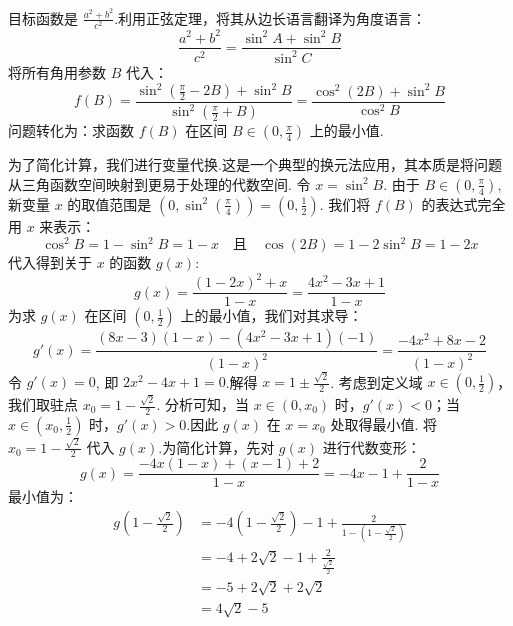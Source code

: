 \begin{solution}
	目标函数是 $\frac{a^2+b^2}{c^2}$.利用正弦定理，将其从边长语言翻译为角度语言：
	\[
	\frac{a^2+b^2}{c^2} = \frac{\sin^2 A + \sin^2 B}{\sin^2 C}
	\]
	将所有角用参数 $B$ 代入：
	\[
	f(B) = \frac{\sin^2(\frac{\pi}{2}-2B) + \sin^2 B}{\sin^2(\frac{\pi}{2}+B)} = \frac{\cos^2(2B) + \sin^2 B}{\cos^2 B}
	\]
	问题转化为：求函数 $f(B)$ 在区间 $B \in (0, \frac{\pi}{4})$ 上的最小值.
	
	为了简化计算，我们进行变量代换.这是一个典型的换元法应用，其本质是将问题从三角函数空间映射到更易于处理的代数空间.
	令 $x = \sin^2 B$.
	由于 $B \in (0, \frac{\pi}{4})$, 新变量 $x$ 的取值范围是 $(0, \sin^2(\frac{\pi}{4})) = (0, \frac{1}{2})$.
	我们将 $f(B)$ 的表达式完全用 $x$ 来表示：
	\[
	\cos^2 B = 1-\sin^2 B = 1-x \quad \text{且} \quad \cos(2B) = 1-2\sin^2 B = 1-2x
	\]
	代入得到关于 $x$ 的函数 $g(x)$:
	\[
	g(x) = \frac{(1-2x)^2+x}{1-x} = \frac{4x^2-3x+1}{1-x}
	\]
	为求 $g(x)$ 在区间 $(0, \frac{1}{2})$ 上的最小值，我们对其求导：
	\[
	g'(x) = \frac{(8x-3)(1-x) - (4x^2-3x+1)(-1)}{(1-x)^2} = \frac{-4x^2+8x-2}{(1-x)^2}
	\]
	令 $g'(x)=0$, 即 $2x^2-4x+1 = 0$.解得 $x = 1 \pm \frac{\sqrt{2}}{2}$.
	考虑到定义域 $x \in (0, \frac{1}{2})$，我们取驻点 $x_0 = 1 - \frac{\sqrt{2}}{2}$.
	分析可知，当 $x \in (0, x_0)$ 时，$g'(x)<0$；当 $x \in (x_0, \frac{1}{2})$ 时，$g'(x)>0$.因此 $g(x)$ 在 $x=x_0$ 处取得最小值.
	将 $x_0 = 1 - \frac{\sqrt{2}}{2}$ 代入 $g(x)$.为简化计算，先对 $g(x)$ 进行代数变形：
	\[
	g(x) = \frac{-4x(1-x)+(x-1)+2}{1-x} = -4x-1+\frac{2}{1-x}
	\]
	最小值为：
	\begin{align*}
		g\left(1 - \frac{\sqrt{2}}{2}\right) &= -4\left(1-\frac{\sqrt{2}}{2}\right) - 1 + \frac{2}{1-\left(1-\frac{\sqrt{2}}{2}\right)} \\
		&= -4 + 2\sqrt{2} - 1 + \frac{2}{\frac{\sqrt{2}}{2}} \\
		&= -5 + 2\sqrt{2} + 2\sqrt{2} \\
		&= 4\sqrt{2}-5
	\end{align*}\hfill\qedsymbol
\end{solution}

